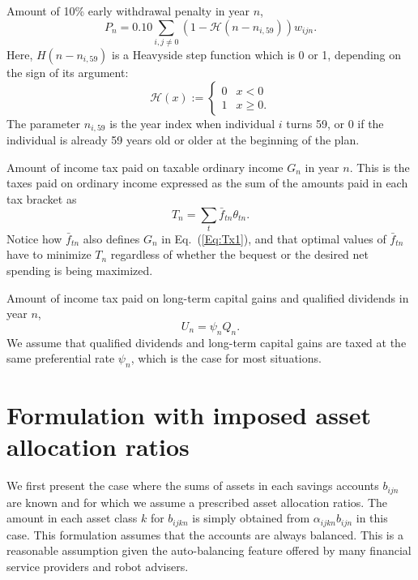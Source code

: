 \documentclass{report}[fleqn,11pt]
\begin{document}
\begin{description}[leftmargin=4em,style=multiline]
\item [$P_n$]
	Amount of 10\% early withdrawal penalty in year $n$,
	\begin{equation}
		\label{Eq:PenTax0}
		P_n = 0.10 \sum_{i, j\neq0} (1 - \mathcal{H}(n - n_{i,59})) w_{ijn}.
	\end{equation}
        Here, $H(n - n_{i, 59})$ is a Heavyside step function which is 0 or 1, depending on the sign of
        its argument:
	\begin{equation}
	\mathcal{H}(x) :=
	\begin{cases}
         0 & x < 0 \\
         1 & x \geq 0.
	\end{cases}
	\end{equation}
        The parameter $n_{i, 59}$ is the year index when individual $i$ turns 59,
	or 0 if the individual is already 59 years old or older at the beginning of the plan.

\item [$T_n$]
	Amount of income tax paid on taxable ordinary income $G_n$ in year $n$.
	This is the taxes paid on ordinary income expressed as the sum of the amounts
	paid in each tax bracket as
	\begin{equation}
		\label{Eq:IncTax1}
		T_n = \sum_t \bar{f}_{tn}\theta_{tn}.
	\end{equation}
	Notice how $\bar{f}_{tn}$ also defines $G_n$ in Eq.~(\ref{Eq:Tx1}), and that optimal
	values of $\bar{f}_{tn}$ have to minimize $T_n$ regardless of whether the bequest or the desired
	net spending is being maximized.

\item [$U_n$]
	Amount of income tax paid on long-term capital gains and qualified dividends in year $n$,
	\begin{equation}
		U_n = \psi_n Q_n.
	\end{equation}
	We assume that qualified dividends and long-term
	capital gains are taxed at the same preferential rate $\psi_n$, which is the case for most situations.

\end{description}

\chapter{Formulation with imposed asset allocation ratios}
We first present the case where the sums of assets in each savings accounts $b_{ijn}$ are known
and for which we assume a prescribed asset allocation ratios.
The amount in each asset class $k$ for $b_{ijkn}$ is simply obtained
from $\alpha_{ijkn} b_{ijn}$ in this case.
This formulation assumes that the accounts are always balanced. This is
a reasonable assumption given the auto-balancing feature offered by many financial service
providers and robot advisers.
\end{document}
